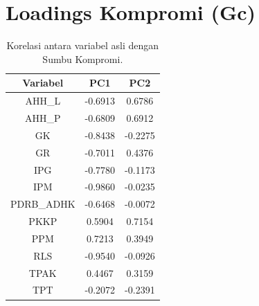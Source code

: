 \section*{Loadings Kompromi (Gc)}
\begin{table}[H]
\centering
\caption{Korelasi antara variabel asli dengan Sumbu Kompromi.} \label{tab:loadings}
\begin{tabular}{|c|c|c|}
\hline
\textbf{Variabel} & \textbf{PC1} & \textbf{PC2} \\
\hline
AHH_L & -0.6913 & 0.6786 \\
AHH_P & -0.6809 & 0.6912 \\
GK & -0.8438 & -0.2275 \\
GR & -0.7011 & 0.4376 \\
IPG & -0.7780 & -0.1173 \\
IPM & -0.9860 & -0.0235 \\
PDRB_ADHK & -0.6468 & -0.0072 \\
PKKP & 0.5904 & 0.7154 \\
PPM & 0.7213 & 0.3949 \\
RLS & -0.9540 & -0.0926 \\
TPAK & 0.4467 & 0.3159 \\
TPT & -0.2072 & -0.2391 \\
\hline
\end{tabular}
\end{table}
\vspace{0.5cm}
